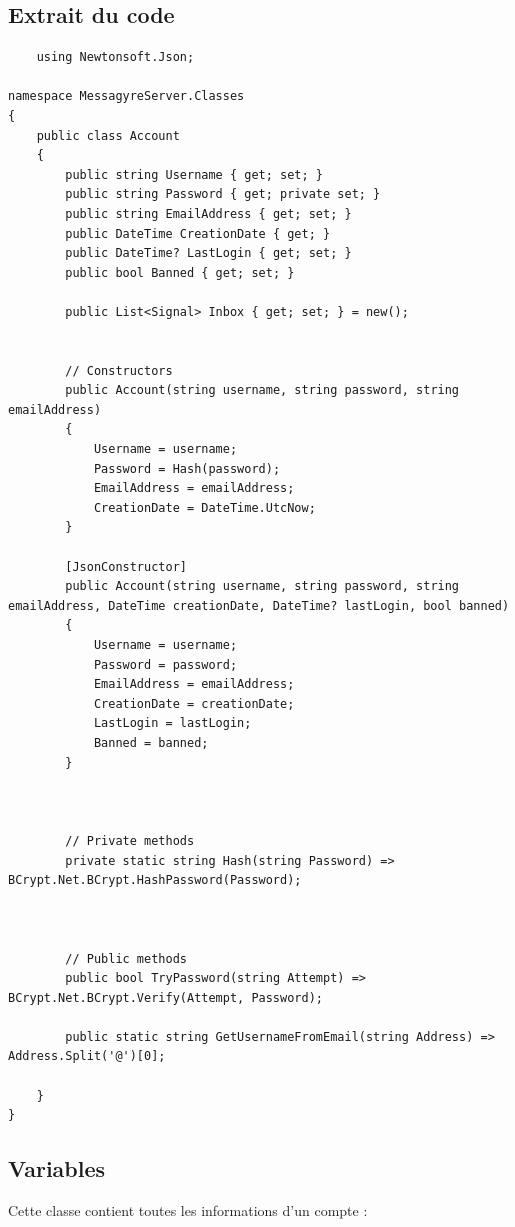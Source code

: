 \documentclass[12pt]{report}
\begin{document}
\subsection{Extrait du code}
\begin{verbatim}
    using Newtonsoft.Json;

namespace MessagyreServer.Classes
{
    public class Account
    {
        public string Username { get; set; }
        public string Password { get; private set; }
        public string EmailAddress { get; set; }
        public DateTime CreationDate { get; }
        public DateTime? LastLogin { get; set; }
        public bool Banned { get; set; }

        public List<Signal> Inbox { get; set; } = new();


        // Constructors 
        public Account(string username, string password, string emailAddress)
        {
            Username = username;
            Password = Hash(password);
            EmailAddress = emailAddress;
            CreationDate = DateTime.UtcNow;
        }

        [JsonConstructor]
        public Account(string username, string password, string emailAddress, DateTime creationDate, DateTime? lastLogin, bool banned)
        {
            Username = username;
            Password = password;
            EmailAddress = emailAddress;
            CreationDate = creationDate;
            LastLogin = lastLogin;
            Banned = banned;
        }



        // Private methods 
        private static string Hash(string Password) => BCrypt.Net.BCrypt.HashPassword(Password);



        // Public methods 
        public bool TryPassword(string Attempt) => BCrypt.Net.BCrypt.Verify(Attempt, Password);

        public static string GetUsernameFromEmail(string Address) => Address.Split('@')[0];

    }
}
\end{verbatim}

\subsection{Variables}
Cette classe contient toutes les informations d'un compte :
\end{document}
